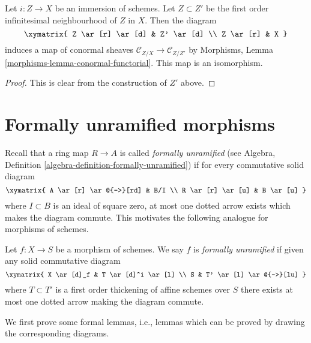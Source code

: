 \begin{lemma}
\label{lemma-infinitesimal-neighbourhood-conormal}
Let $i : Z \to X$ be an immersion of schemes. Let $Z \subset Z'$ be
the first order infinitesimal neighbourhood of $Z$ in $X$.
Then the diagram
$$
\xymatrix{
Z \ar[r] \ar[d] & Z' \ar[d] \\
Z \ar[r] & X
}
$$
induces a map of conormal sheaves $\mathcal{C}_{Z/X} \to \mathcal{C}_{Z/Z'}$ by
Morphisms, Lemma \ref{morphisms-lemma-conormal-functorial}.
This map is an isomorphism.
\end{lemma}

\begin{proof}
This is clear from the construction of $Z'$ above.
\end{proof}
















\section{Formally unramified morphisms}
\label{section-formally-unramified}

\noindent
Recall that a ring map $R \to A$ is called {\it formally unramified}
(see Algebra, Definition \ref{algebra-definition-formally-unramified})
if for every commutative solid diagram
$$
\xymatrix{
A \ar[r] \ar@{-->}[rd] & B/I \\
R \ar[r] \ar[u] & B \ar[u]
}
$$
where $I \subset B$ is an ideal of square zero, at most one dotted
arrow exists which makes the diagram commute. This motivates
the following analogue for morphisms of schemes.

\begin{definition}
\label{definition-formally-unramified}
Let $f : X \to S$ be a morphism of schemes.
We say $f$ is {\it formally unramified} if given any solid commutative diagram
$$
\xymatrix{
X \ar[d]_f & T \ar[d]^i \ar[l] \\
S & T' \ar[l] \ar@{-->}[lu]
}
$$
where $T \subset T'$ is a first order thickening of affine schemes over $S$
there exists at most one dotted arrow making the diagram commute.
\end{definition}

\noindent
We first prove some formal lemmas, i.e., lemmas which can be proved by
drawing the corresponding diagrams.

